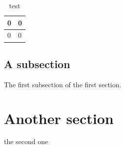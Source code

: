 \documentclass[12pt, b5paper,twoside]{tesi_upf}
\begin{document}
\begin{table}[h]
  \centering
  \begin{tabular}{|l|l|}
   \hline
    0 & 0 \\ \hline
    0 & 0 \\ \hline    
  \end{tabular}
  \caption{test}

\end{table}

\subsection{A subsection}
The first subsection of the first section.

\section{Another section}
the second one 
\end{document}

